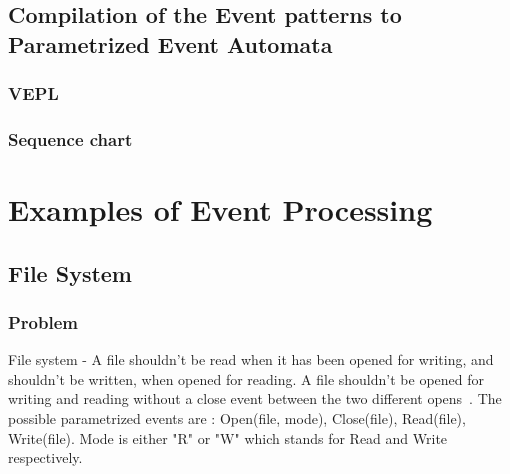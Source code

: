 			
				

		\subsection{Compilation of the Event patterns to Parametrized Event Automata}
			
			\subsubsection{VEPL}
			
			\subsubsection{Sequence chart}
			
			
	\section{Examples of Event Processing}
 
 
		\subsection{File System}
			\subsubsection{Problem}
				File system - A file shouldn't be read when it has been opened for writing, and shouldn't be written, when opened for reading. 
				A file shouldn't be opened for writing and reading without a close event between the two different opens~\citep{marq}.
				The possible parametrized events are : 
				Open(file, mode), 
				Close(file), 
				Read(file), 
				Write(file). 
				Mode is either "R" or "W" which stands for Read and Write respectively.
